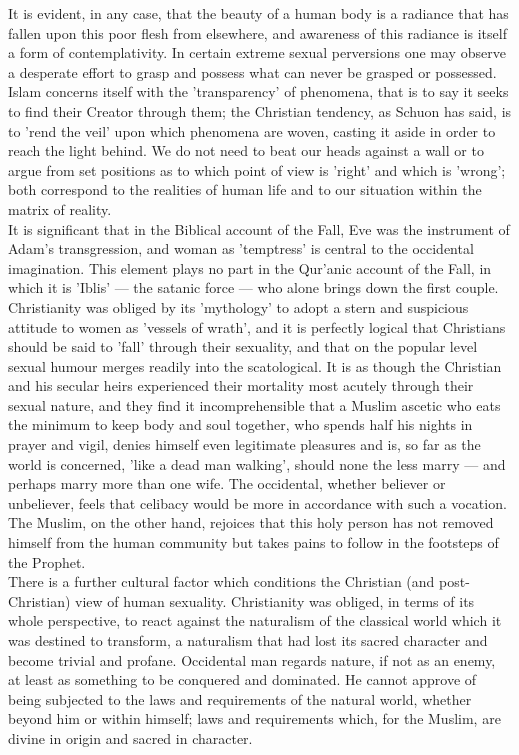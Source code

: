 \documentclass[10pt, twoside,openright]{book}
\begin{document}
It is evident, in any case, that the beauty of a human body is a radiance that has fallen upon this 
poor flesh from elsewhere, and awareness of this radiance is itself a form of contemplativity. In 
certain extreme sexual perversions one may observe a desperate effort to grasp and possess what can 
never be grasped or possessed. Islam concerns itself with the 'transparency' of phenomena, that is to 
say it seeks to find their Creator through them; the Christian tendency, as Schuon has said, is to 
'rend the veil' upon which phenomena are woven, casting it aside in order to reach the light behind. 
We do not need to beat our heads against a wall or to argue from set positions as to which point of 
view is 'right' and which is 'wrong'; both correspond to the realities of human life and to our 
situation within the matrix of reality. \\

It is significant that in the Biblical account of the Fall, Eve was the instrument of Adam's 
transgression, and woman as 'temptress' is central to the occidental imagination. This element plays 
no part in the Qur'anic account of the Fall, in which it is 'Iblis' --- the satanic force --- who alone 
brings down the first couple. Christianity was obliged by its 'mythology' to adopt a stern and 
suspicious attitude to women as 'vessels of wrath', and it is perfectly logical that Christians 
should be said to 'fall' through their sexuality, and that on the popular level sexual humour merges 
readily into the scatological. It is as though the Christian and his secular heirs experienced their 
mortality most acutely through their sexual nature, and they find it incomprehensible that a Muslim 
ascetic who eats the minimum to keep body and soul together, who spends half his nights in prayer and 
vigil, denies himself even legitimate pleasures and is, so far as the world is concerned, 'like a 
dead man walking', should none the less marry --- and perhaps marry more than one wife. The occidental, 
whether believer or unbeliever, feels that celibacy would be more in accordance with such a vocation. 
The Muslim, on the other hand, rejoices that this holy person has not removed himself from the human 
community but takes pains to follow in the footsteps of the Prophet. \\

There is a further cultural factor which conditions the Christian (and post\hyp{}Christian) view of human 
sexuality. Christianity was obliged, in terms of its whole perspective, to react against the 
naturalism of the classical world which it was destined to transform, a naturalism that had lost its 
sacred character and become trivial and profane. Occidental man regards nature, if not as an enemy, 
at least as something to be conquered and dominated. He cannot approve of being subjected to the laws 
and requirements of the natural world, whether beyond him or within himself; laws and requirements 
which, for the Muslim, are divine in origin and sacred in character. \\
\end{document}
